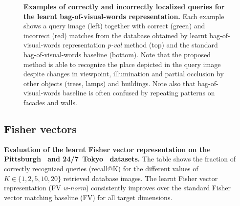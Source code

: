     \begin{figure}[t!]
      
      \caption{
          \textbf{Examples  of correctly and incorrectly localized queries for the learnt bag-of-visual-words representation.}
          Each example shows a query image (left) together with correct (green) and incorrect (red) matches from the database obtained by learnt bag-of-visual-words representation \emph{p-val} method (top) and the standard bag-of-visual-words baseline (bottom). Note that the proposed method is able to recognize the place depicted in the query image despite changes in viewpoint, illumination and partial occlusion by other objects (trees, lamps) and buildings. Note also that bag-of-visual-words baseline is often confused by repeating patterns on facades and walls. 
      }
      \label{fig:images}
    \end{figure}



  \subsection{Fisher vectors}
  \label{sec:fisher_restuls}
  
    \begin{table}[tbp]
      \begin{centering}
        
        \caption{ 
          \textcolor{petr}{
            \textbf{Evaluation of the learnt Fisher vector representation on the Pittsburgh~\cite{Gronat13} and 24/7~Tokyo~\cite{Torii2015} datasets.}
            The table shows the fraction of correctly recognized queries (recall@K) for the different values of $K\in\{1,2,5,10,20\}$ retrieved database images. The learnt Fisher vector representation (FV \emph{w-norm}) consistently improves over the standard Fisher vector matching baseline (FV) for all target dimensions.
          }
        }
        \label{tab:recallFV}
      \end{centering}
    \end{table}

